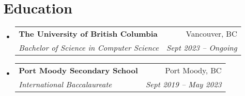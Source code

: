 \documentclass[letterpaper,11pt]{article}
\makeatletter
\newcommand{\resumeSubheading}[4]{
  \vspace{-2pt}\item
    \begin{tabular*}{0.97\textwidth}[t]{l@{\extracolsep{\fill}}r}
      \textbf{#1} & #2 \\
      \textit{\small#3} & \textit{\small #4} \\
    \end{tabular*}\vspace{-7pt}
}
\newcommand{\resumeSubHeadingListStart}{\begin{itemize}[leftmargin=0.15in, label={}]}
\newcommand{\resumeSubHeadingListEnd}{\end{itemize}}
\makeatother
\begin{document}
\section{Education}
  \resumeSubHeadingListStart
    \resumeSubheading
      {The University of British Columbia}{Vancouver, BC}
      {Bachelor of Science in Computer Science}{Sept 2023 -- Ongoing}
    \resumeSubheading
      {Port Moody Secondary School}{Port Moody, BC}
      {International Baccalaureate}{Sept 2019 -- May 2023}
  \resumeSubHeadingListEnd


\end{document}
